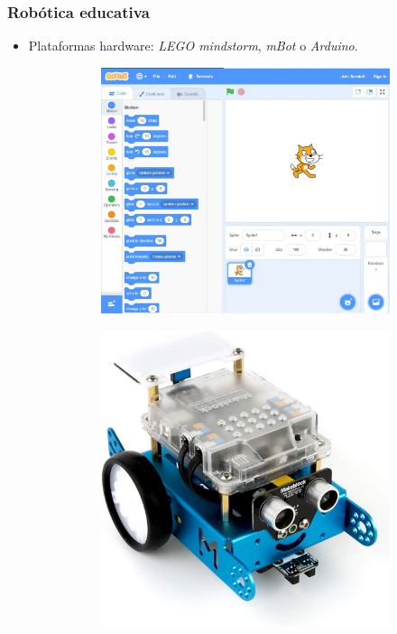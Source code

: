 \documentclass[xcolor={table}]{beamer}
\begin{document}
	\begin{frame}
		\frametitle{Robótica educativa}
		\begin{itemize}
	          \item Plataformas hardware: \textit{LEGO mindstorm}, \textit{mBot} o \textit{Arduino}.
        \begin{figure}[H]
        \centering
        \begin{subfigure}{\textwidth}
            \includegraphics[scale=0.13]{img/scratch.jpg}
        \label{fig:scratch}
        \end{subfigure}\hfill
        \begin{subfigure}{\textwidth}
            \includegraphics[scale=0.1]{img/mBotReal.jpg}

\end{subfigure}
\end{figure}
\end{itemize}
\end{frame}
\end{document}
